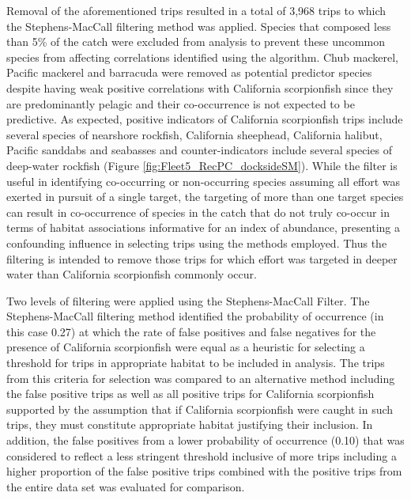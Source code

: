 \documentclass[12pt,]{article}
\begin{document}
Removal of the aforementioned trips resulted in a total of 3,968 trips
to which the Stephens-MacCall filtering method was applied. Species that
composed less than 5\% of the catch were excluded from analysis to
prevent these uncommon species from affecting correlations identified
using the algorithm. Chub mackerel, Pacific mackerel and barracuda were
removed as potential predictor species despite having weak positive
correlations with California scorpionfish since they are predominantly
pelagic and their co-occurrence is not expected to be predictive. As
expected, positive indicators of California scorpionfish trips include
several species of nearshore rockfish, California sheephead, California
halibut, Pacific sanddabs and seabasses and counter-indicators include
several species of deep-water rockfish (Figure
\ref{fig:Fleet5_RecPC_docksideSM}). While the filter is useful in
identifying co-occurring or non-occurring species assuming all effort
was exerted in pursuit of a single target, the targeting of more than
one target species can result in co-occurrence of species in the catch
that do not truly co-occur in terms of habitat associations informative
for an index of abundance, presenting a confounding influence in
selecting trips using the methods employed. Thus the filtering is
intended to remove those trips for which effort was targeted in deeper
water than California scorpionfish commonly occur.

Two levels of filtering were applied using the Stephens-MacCall Filter.
The Stephens-MacCall filtering method identified the probability of
occurrence (in this case 0.27) at which the rate of false positives and
false negatives for the presence of California scorpionfish were equal
as a heuristic for selecting a threshold for trips in appropriate
habitat to be included in analysis. The trips from this criteria for
selection was compared to an alternative method including the false
positive trips as well as all positive trips for California scorpionfish
supported by the assumption that if California scorpionfish were caught
in such trips, they must constitute appropriate habitat justifying their
inclusion. In addition, the false positives from a lower probability of
occurrence (0.10) that was considered to reflect a less stringent
threshold inclusive of more trips including a higher proportion of the
false positive trips combined with the positive trips from the entire
data set was evaluated for comparison.
\end{document}
